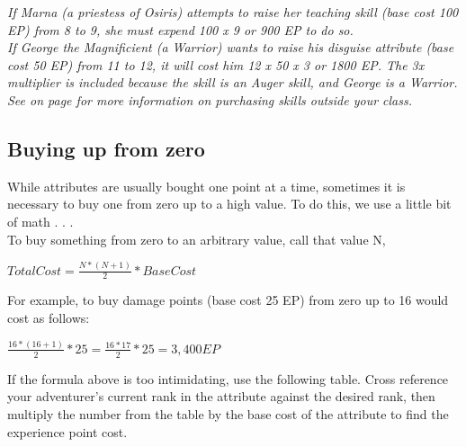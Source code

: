 \begin{multicols}{2}
\textit{If Marna (a priestess of Osiris) attempts to raise her teaching skill (base cost 100 EP) from 8 to 9, she must expend 100 x 9 or 900 EP to do so.\\
If George the Magnificient (a Warrior) wants to raise his disguise attribute (base cost 50 EP) from 11 to 12, it will cost him 12 x 50 x 3 or 1800 EP. The 3x multiplier is included because the skill is an Auger skill, and George is a Warrior. See  on page \textbf{\pageref{create-skills}} for more information on purchasing skills outside your class.}
\subsection{Buying up from zero}
While attributes are usually bought one point at a time, sometimes it is necessary to buy one from zero up to a high value. To do this, we use a little bit of math . . .\\
To buy something from zero to an arbitrary value, call that value N,

$Total Cost = \frac{N * (N+1)}{2} * Base Cost$

For example, to buy damage points (base cost 25 EP) from zero up to 16 would cost as follows:

$\frac{16 * (16+1)}{2} * 25 = \frac{16*17}{2} * 25 = 3,400 EP$

If the formula above is too intimidating, use the following table. Cross reference your adventurer’s current rank in the attribute against the desired rank, then multiply the number from the table by the base cost of the attribute to find the experience point cost.

\end{multicols}
